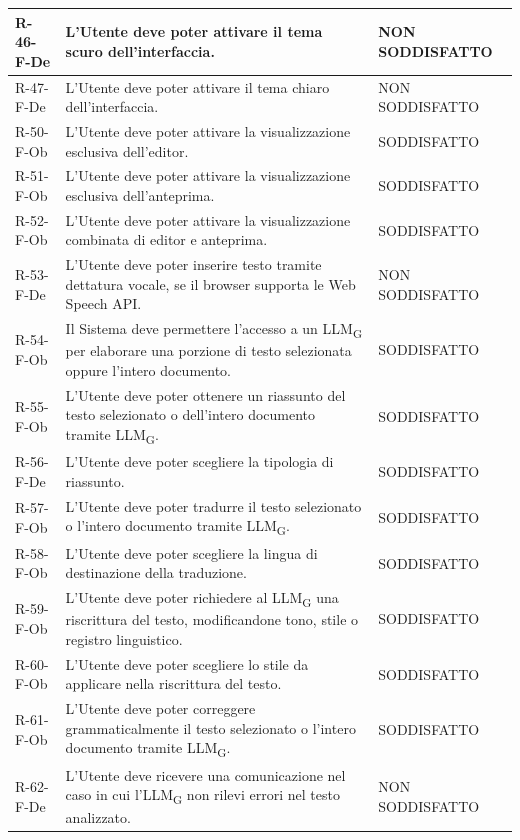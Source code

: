 \documentclass[a4paper, 10pt]{article}
\begin{document}
\begin{longtable}{|p{2.1cm}|p{9.6cm}|p{2.6cm}|}
    R-46-F-De & L'Utente deve poter attivare il tema scuro dell'interfaccia. & NON SODDISFATTO \\ \hline
    R-47-F-De & L'Utente deve poter attivare il tema chiaro dell'interfaccia. & NON SODDISFATTO \\ \hline
    R-50-F-Ob & L'Utente deve poter attivare la visualizzazione esclusiva dell'editor. & SODDISFATTO \\ \hline
    R-51-F-Ob & L'Utente deve poter attivare la visualizzazione esclusiva dell'anteprima. & SODDISFATTO \\ \hline
    R-52-F-Ob & L'Utente deve poter attivare la visualizzazione combinata di editor e anteprima. & SODDISFATTO \\ \hline
    R-53-F-De & L'Utente deve poter inserire testo tramite dettatura vocale, se il browser supporta le Web Speech API. & NON SODDISFATTO \\ \hline
    R-54-F-Ob & Il Sistema deve permettere l'accesso a un LLM\textsubscript{G} per elaborare una porzione di testo selezionata oppure l'intero documento. & SODDISFATTO \\ \hline
    R-55-F-Ob & L'Utente deve poter ottenere un riassunto del testo selezionato o dell'intero documento tramite LLM\textsubscript{G}. & SODDISFATTO \\ \hline
    R-56-F-De & L'Utente deve poter scegliere la tipologia di riassunto. & SODDISFATTO \\ \hline
    R-57-F-Ob & L'Utente deve poter tradurre il testo selezionato o l'intero documento tramite LLM\textsubscript{G}. & SODDISFATTO \\ \hline
    R-58-F-Ob & L'Utente deve poter scegliere la lingua di destinazione della traduzione. & SODDISFATTO \\ \hline
    R-59-F-Ob & L'Utente deve poter richiedere al LLM\textsubscript{G} una riscrittura del testo, modificandone tono, stile o registro linguistico. & SODDISFATTO \\ \hline
    R-60-F-Ob & L'Utente deve poter scegliere lo stile da applicare nella riscrittura del testo. & SODDISFATTO \\ \hline
    R-61-F-Ob & L'Utente deve poter correggere grammaticalmente il testo selezionato o l'intero documento tramite LLM\textsubscript{G}. & SODDISFATTO \\ \hline
    R-62-F-De & L'Utente deve ricevere una comunicazione nel caso in cui l'LLM\textsubscript{G} non rilevi errori nel testo analizzato. & NON SODDISFATTO \\ \hline

\end{longtable}
\end{document}
